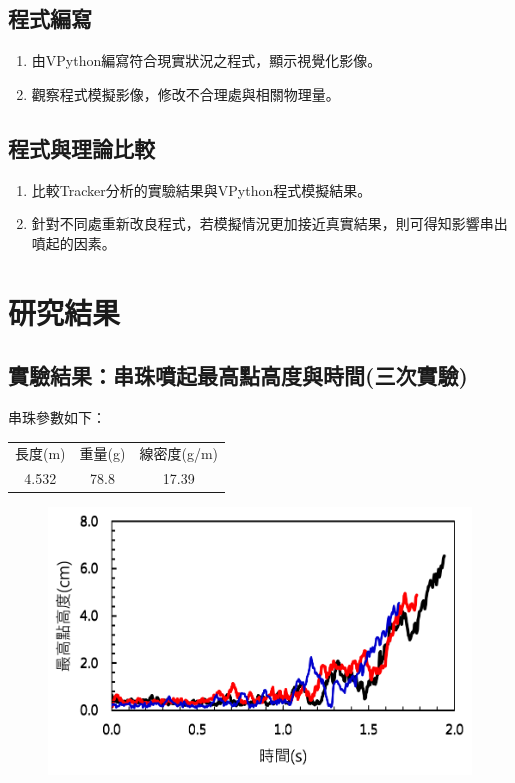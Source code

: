 \documentclass[11pt,twoside,b5paper]{article}
\begin{document}
\subsection{程式編寫}
    \begin{enumerate}
        \item 由VPython編寫符合現實狀況之程式，顯示視覺化影像。
        \item 觀察程式模擬影像，修改不合理處與相關物理量。
    \end{enumerate}
\subsection{程式與理論比較}
\begin{enumerate}
    \item 比較Tracker分析的實驗結果與VPython程式模擬結果。
    \item 針對不同處重新改良程式，若模擬情況更加接近真實結果，則可得知影響串出噴起的因素。
\end{enumerate}

\section{研究結果}

\subsection{實驗結果：串珠噴起最高點高度與時間(三次實驗)}

串珠參數如下：
\begin{table}[H]
    \centering
    \begin{tabular}{c|c|c}
    長度(m) & 重量(g) & 線密度(g/m) \\
    4.532 & 78.8 & 17.39
    \end{tabular}
\end{table}

\begin{figure}[H]
    \centering
    \includegraphics[scale=0.5]{b.PNG}
\end{figure}
\end{document}
